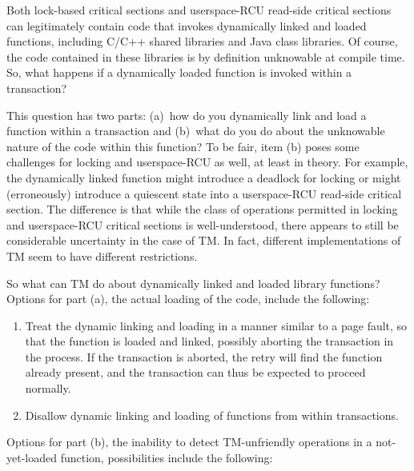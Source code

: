 Both lock-based critical sections and userspace-RCU read-side critical sections
can legitimately contain code that invokes dynamically linked and loaded
functions, including C/C++ shared libraries and Java class libraries.
Of course, the code contained in these libraries is by definition
unknowable at compile time.
So, what happens if a dynamically loaded function is invoked within
a transaction?

This question has two parts: (a)~how do you dynamically link and load a
function within a transaction and (b)~what do you do about the unknowable
nature of the code within this function?
To be fair, item (b) poses some challenges for locking and userspace-RCU
as well, at least in theory.
For example, the dynamically linked function might introduce a deadlock
for locking or might (erroneously) introduce a quiescent state into a
userspace-RCU read-side critical section.
The difference is that while the class of operations permitted in locking
and userspace-RCU critical sections is well-understood, there appears
to still be considerable uncertainty in the case of TM.
In fact, different implementations of TM seem to have different restrictions.

So what can TM do about dynamically linked and loaded library functions?
Options for part (a), the actual loading of the code, include the following:

\begin{enumerate}
\item	Treat the dynamic linking and loading in a manner similar to a
	page fault, so that the function is loaded and linked, possibly
	aborting the transaction in the process.
	If the transaction is aborted, the retry will find the function
	already present, and the transaction can thus be expected to
	proceed normally.
\item	Disallow dynamic linking and loading of functions from within
	transactions.
\end{enumerate}

Options for part (b), the inability to detect TM-unfriendly operations
in a not-yet-loaded function, possibilities include the following:

